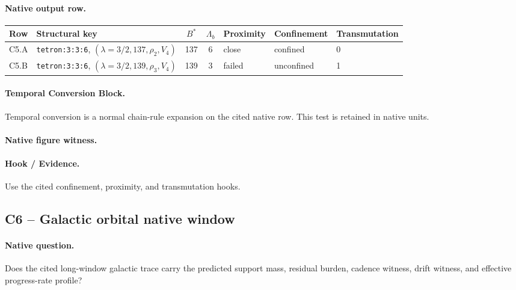 \paragraph{Native output row.}
\begin{center}
\begin{tabularx}{\linewidth}{@{}lXcclll@{}}
\toprule
Row & Structural key & $B^*$ & $\Lambda_b$ & Proximity & Confinement & Transmutation \\
\midrule
C5.A & \texttt{tetron:3:3:6}, $(\lambda=3/2,137,\rho_2,V_4)$ & 137 & 6 & close & confined & 0 \\
C5.B & \texttt{tetron:3:3:6}, $(\lambda=3/2,139,\rho_3,V_4)$ & 139 & 3 & failed & unconfined & 1 \\
\bottomrule
\end{tabularx}
\end{center}
\paragraph{Temporal Conversion Block.} Temporal conversion is a normal chain-rule expansion on the cited native row. This test is retained in native units.
\paragraph{Native figure witness.}
\begin{center}
\end{center}
\paragraph{Hook / Evidence.} Use the cited confinement, proximity, and transmutation hooks.

\subsection{C6 -- Galactic orbital native window}\label{app:c6}
\paragraph{Native question.} Does the cited long-window galactic trace carry the predicted support mass, residual burden, cadence witness, drift witness, and effective progress-rate profile?
